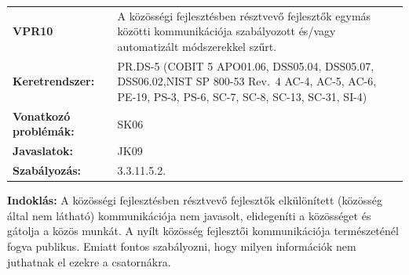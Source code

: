 \documentclass[12pt,magyar,a4paper,oneside]{scrreprt}
\begin{document}
\begin{longtable}[]{@{}ll@{}}
\toprule
\endhead
\begin{minipage}[t]{0.16\columnwidth}\raggedright
\textbf{VPR10}\strut
\end{minipage} & \begin{minipage}[t]{0.79\columnwidth}\raggedright
A közösségi fejlesztésben résztvevő fejlesztők egymás közötti
kommunikációja szabályozott és/vagy automatizált módszerekkel
szűrt.\strut
\end{minipage}\tabularnewline
\begin{minipage}[t]{0.16\columnwidth}\raggedright
\textbf{Keretrendszer:}\strut
\end{minipage} & \begin{minipage}[t]{0.79\columnwidth}\raggedright
PR.DS-5 (COBIT 5 APO01.06, DSS05.04, DSS05.07, DSS06.02,NIST SP 800-53
Rev.~4 AC-4, AC-5, AC-6, PE-19, PS-3, PS-6, SC-7, SC-8, SC-13, SC-31,
SI-4)\strut
\end{minipage}\tabularnewline
\begin{minipage}[t]{0.16\columnwidth}\raggedright
\textbf{Vonatkozó problémák:}\strut
\end{minipage} & \begin{minipage}[t]{0.79\columnwidth}\raggedright
SK06\strut
\end{minipage}\tabularnewline
\begin{minipage}[t]{0.16\columnwidth}\raggedright
\textbf{Javaslatok:}\strut
\end{minipage} & \begin{minipage}[t]{0.79\columnwidth}\raggedright
JK09\strut
\end{minipage}\tabularnewline
\begin{minipage}[t]{0.16\columnwidth}\raggedright
\textbf{Szabályozás:}\strut
\end{minipage} & \begin{minipage}[t]{0.79\columnwidth}\raggedright
3.3.11.5.2.\strut
\end{minipage}\tabularnewline
\bottomrule
\end{longtable}

\textbf{Indoklás: } A közösségi fejlesztésben résztvevő fejlesztők
elkülönített (közösség által nem látható) kommunikációja nem javasolt,
elidegeníti a közösséget és gátolja a közös munkát. A nyílt közösség
fejlesztői kommunikációja természeténél fogva publikus. Emiatt fontos
szabályozni, hogy milyen információk nem juthatnak el ezekre a
csatornákra.
\end{document}
